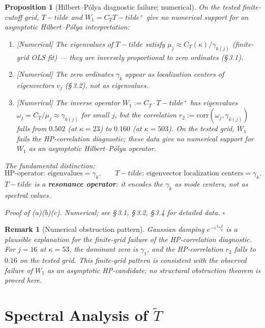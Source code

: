 \documentclass[11pt]{article}
\def\Tt{T-tilde}%
\newtheorem{proposition}[theorem]{Proposition}
\newtheorem*{remark}{Remark}
\newcommand{\Tt}{\widetilde{T}}
\newcommand{\CT}{C_{T}}
\newcommand{\Wone}{W_1}
\begin{document}
\begin{proposition}[Hilbert--P\'olya diagnostic failure; numerical]\label{prop:not-HP}
On the tested finite-cutoff grid, $\Tt$ and $\Wone=\CT\Tt^+$
give no numerical support for an asymptotic Hilbert--P\'olya
interpretation:
\begin{enumerate}[label=(\alph*)]
\item \emph{[Numerical]} The eigenvalues of $\Tt$ satisfy
  $\mu_j\approx\CT(\kappa)/\gamma_{k(j)}$ (finite-grid OLS fit) --- they are \emph{inversely} proportional
  to zero ordinates (\S\,3.1).
\item \emph{[Numerical]} The zero ordinates $\gamma_k$ appear as
  \emph{localization centers} of eigenvectors $v_j$ (\S\,3.2),
  not as eigenvalues.
\item \emph{[Numerical]} The inverse operator $\Wone := \CT\cdot\Tt^+$
  has eigenvalues $\omega_j = \CT/\mu_j \approx \gamma_{k(j)}$
  for small $j$, but the correlation
  $r_2 := \mathrm{corr}(\omega_j, \gamma_{k(j)})$
  falls from $0.502$ (at $\kappa=23$) to $0.160$ (at $\kappa=503$).
  On the tested grid, $\Wone$ fails the HP-correlation diagnostic;
these data give no numerical support for $\Wone$ as an
asymptotic Hilbert--P\'olya operator.
\end{enumerate}
\emph{The fundamental distinction:}
\[
\text{HP-operator: eigenvalues} = \gamma_k.
\qquad
\Tt\text{: eigenvector localization centers} = \gamma_k.
\]
$\Tt$ is a \textbf{resonance operator}: it encodes the $\gamma_k$
as mode centers, not as spectral values.

\emph{Proof of (a)(b)(c).}
Numerical; see \S\,3.1, \S\,3.2, \S\,3.4 for detailed data. $\square$
\end{proposition}

\begin{remark}[Numerical obstruction pattern]
Gaussian damping $e^{-\varepsilon^2\gamma_k^2}$ is a plausible
explanation for the finite-grid failure of the HP-correlation
diagnostic. For $j=16$ at $\kappa=53$, the dominant zero is $\gamma_1$,
and the HP-correlation $r_2$ falls to $0.16$ on the tested grid.
This finite-grid pattern is consistent with the observed
failure of $\Wone$ as an asymptotic HP-candidate;
no structural obstruction theorem is proved here.
\end{remark}

\section{Spectral Analysis of $\widetilde{T}$}
\end{document}
